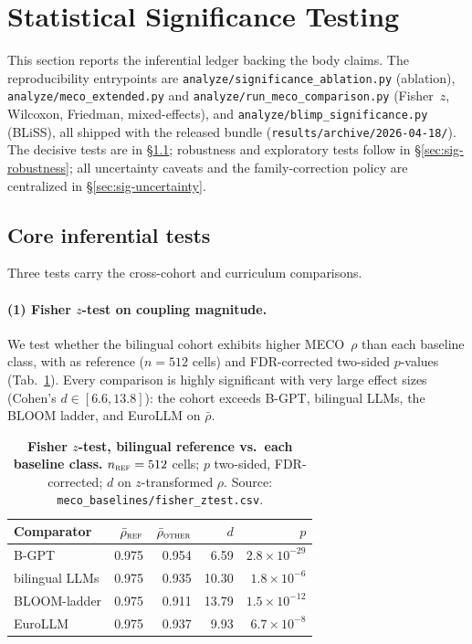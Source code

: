 \section{Statistical Significance Testing}\label{sec:significance-comprehensive}

This section reports the inferential ledger backing the body claims. The reproducibility entrypoints are \texttt{analyze/significance\_ablation.py} (ablation), \texttt{analyze/meco\_extended.py} and \texttt{analyze/run\_meco\_comparison.py} (Fisher~$z$, Wilcoxon, Friedman, mixed-effects), and \texttt{analyze/blimp\_significance.py} (BLiSS), all shipped with the released bundle (\texttt{results/archive/2026-04-18/}). The decisive tests are in \S\ref{sec:sig-core}; robustness and exploratory tests follow in \S\ref{sec:sig-robustness}; all uncertainty caveats and the family-correction policy are centralized in \S\ref{sec:sig-uncertainty}.

\subsection{Core inferential tests}\label{sec:sig-core}

Three tests carry the cross-cohort and curriculum comparisons.

\paragraph{(1) Fisher $z$-test on coupling magnitude.} We test whether the \beetle{} bilingual cohort exhibits higher MECO~$\rho$ than each baseline class, with \beetle{} as reference ($n=512$ cells) and FDR-corrected two-sided $p$-values (Tab.~\ref{tab:sig_fisher}). Every comparison is highly significant with very large effect sizes (Cohen's $d\in[6.6,13.8]$): the \beetle{} cohort exceeds B-GPT, bilingual LLMs, the BLOOM ladder, and EuroLLM on $\bar\rho$.

\begin{table}[!ht]
  \centering
  \small
  \caption{\textbf{Fisher $z$-test, \beetle{} bilingual reference vs.\ each baseline class.} $n_\textsc{ref}=512$ cells; $p$ two-sided, FDR-corrected; $d$ on $z$-transformed $\rho$. Source: \texttt{meco\_baselines/fisher\_ztest.csv}.}
  \label{tab:sig_fisher}
  \begin{tabular}{lrrrr}
    \toprule
    Comparator & $\bar\rho_\textsc{ref}$ & $\bar\rho_\textsc{other}$ & $d$ & $p$ \\
    \midrule
    B-GPT           & 0.975 & 0.954 & 6.59  & $2.8{\times}10^{-29}$ \\
    bilingual LLMs  & 0.975 & 0.935 & 10.30 & $1.8{\times}10^{-6}$ \\
    BLOOM-ladder    & 0.975 & 0.911 & 13.79 & $1.5{\times}10^{-12}$ \\
    EuroLLM         & 0.975 & 0.937 & 9.93  & $6.7{\times}10^{-8}$ \\
    \bottomrule
  \end{tabular}
\end{table}

